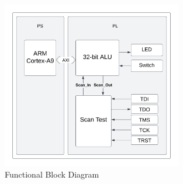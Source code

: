 \begin{figure}[h] %
  \centering
  \setlength{\abovecaptionskip}{-10pt} %
  \setlength{\belowcaptionskip}{-10pt} %
  \includegraphics[width=0.7\textwidth]{Image/ARM.png} %
  \caption{Functional Block Diagram}
  \label{Figure 1 : Functional Block Diagram}
\end{figure}





